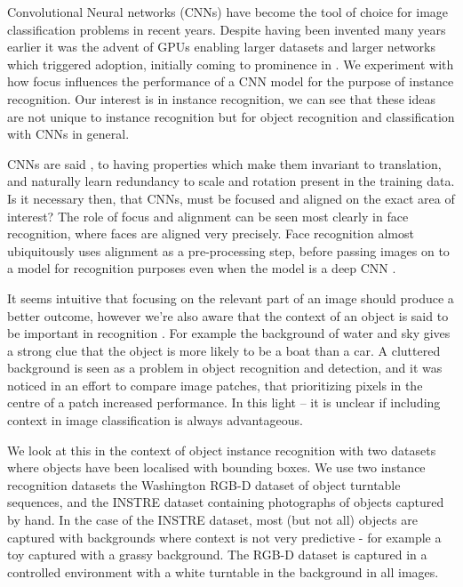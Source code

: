 Convolutional Neural networks (\gls{CNN}s) \cite{LeCun1998} have become the tool of choice for image classification problems in recent years. Despite having been invented many years earlier it was the advent of GPUs enabling larger datasets and larger networks which triggered adoption, initially coming to prominence in \cite {Krizhevsky2012}.  We experiment with how focus influences the performance of a CNN model for the purpose of instance recognition. Our interest is in instance recognition, we can see that these ideas are not unique to instance recognition but for object recognition and classification with \gls{CNN}s in general.

\gls{CNN}s are said \cite{Krizhevsky2012}, to having properties which make them invariant to translation, and naturally learn redundancy to scale and rotation present in the training data. Is it necessary then, that \gls{CNN}s, must be focused and aligned on the exact area of interest? The role of focus and alignment can be seen most clearly in face recognition, where faces are aligned very precisely. Face recognition almost ubiquitously uses alignment as a pre-processing step, before passing images on to a model for recognition purposes even when the model is a deep CNN \cite{Taigman2014}.

It seems intuitive that focusing on the relevant part of an image should produce a better outcome, however we're also aware that the context of an object is said to be important in recognition \cite{Oliva2007}. For example the background of water and sky gives a strong clue that the object is more likely to be a boat than a car. A cluttered background is seen as a problem in object recognition and detection, and it was noticed in an effort to compare image patches, that prioritizing pixels in the centre of a patch \cite{Zagoruyko2015} increased performance. In this light -- it is unclear if including context in image classification is always advantageous. 

We look at this in the context of object instance recognition with two datasets where objects have been localised with bounding boxes. We use two instance recognition datasets the Washington RGB-D dataset \cite{Lai2011} of object turntable sequences, and the INSTRE dataset \cite{Wang2015} containing photographs of objects captured by hand. In the case of the INSTRE dataset, most (but not all) objects are captured with backgrounds where context is not very predictive - for example a toy captured with a grassy background. The RGB-D dataset is captured in a controlled environment with a white turntable in the background in all images.

